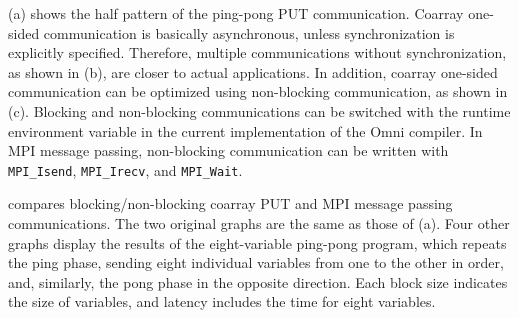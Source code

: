 (a) shows the half pattern of the ping-pong PUT communication.
Coarray one-sided communication is basically asynchronous, unless 
synchronization is explicitly specified. Therefore, multiple communications
without synchronization, as shown in (b), are closer to actual applications.
In addition, coarray one-sided communication can be optimized using non-blocking communication, as shown in (c).
Blocking and non-blocking communications can be switched with the runtime environment
variable in the current implementation of the Omni compiler.
In MPI message passing, non-blocking communication can be written with 
{\tt MPI\_Isend}, {\tt MPI\_Irecv}, and {\tt MPI\_Wait}.


 compares blocking/non-blocking coarray PUT and 
MPI message passing communications.
The two original graphs are the same as those of (a).
Four other graphs display the results of the eight-variable ping-pong program, 
which repeats the ping phase, sending eight individual variables 
from one  to the other in order, and, similarly, the pong phase
in the opposite direction.
Each block size indicates the size of variables, and latency includes the
time for eight variables.

